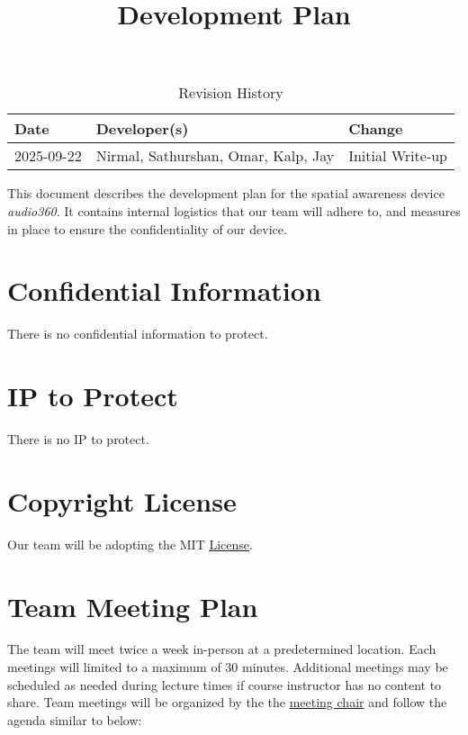 \documentclass{article}
\title{Development Plan\\\progname}
\author{\authname}
\date{}
\begin{document}
\maketitle

\begin{table}[hp]
\caption{Revision History} \label{TblRevisionHistory}
\begin{tabularx}{\textwidth}{llX}
\toprule
\textbf{Date} & \textbf{Developer(s)} & \textbf{Change}\\
\midrule
2025-09-22 & Nirmal, Sathurshan, Omar, Kalp, Jay & Initial Write-up\\
\bottomrule
\end{tabularx}
\end{table}

\newpage{}

This document describes the development plan for the spatial awareness device
\textit{audio360}. It contains internal logistics that our team will adhere to,
and measures in place to ensure the confidentiality of our device.

\section{Confidential Information}

There is no confidential information to protect.

\section{IP to Protect}

There is no IP to protect.

\section{Copyright License}

Our team will be adopting the MIT
\href{https://github.com/Nirmal-code/SixSense/blob/main/LICENSE}{License}.

\section{Team Meeting Plan}

The team will meet twice a week in-person at a predetermined location. Each
meetings will limited to a maximum of 30 minutes. Additional meetings may be
scheduled as needed during lecture times if course instructor has no content to
share. Team meetings will be organized by the the
\hyperref[role:meeting_chair]{meeting chair} and follow the agenda similar to
below:
\end{document}
